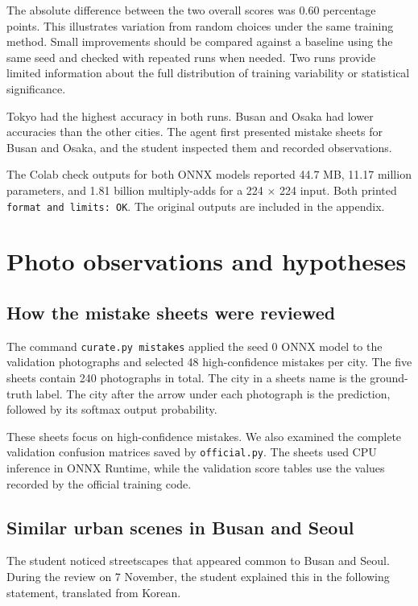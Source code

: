 \documentclass[11pt]{article}
\begin{document}
The absolute difference between the two overall scores was 0.60 percentage
points. This illustrates variation from random choices under the same training
method. Small improvements should be compared against a baseline using the
same seed and checked with repeated runs when needed. Two runs provide
limited information about the full distribution of training variability or
statistical significance.

Tokyo had the highest accuracy in both runs. Busan and Osaka had lower
accuracies than the other cities. The agent first presented mistake sheets
for Busan and Osaka, and the student inspected them and recorded observations.

The Colab check outputs for both ONNX models reported 44.7 MB, 11.17 million
parameters, and 1.81 billion multiply-adds for a 224 $\times$ 224 input.
Both printed \texttt{format and limits: OK}. The original outputs are included
in the appendix.

\section{Photo observations and hypotheses}

\subsection{How the mistake sheets were reviewed}

The command \texttt{curate.py mistakes} applied the seed 0 ONNX model to the
validation photographs and selected 48 high-confidence mistakes per city.
The five sheets contain 240 photographs in total. The city in a sheet\textquotesingle{}s name
is the ground-truth label. The city after the arrow under each photograph is
the prediction, followed by its softmax output probability.

These sheets focus on high-confidence mistakes. We also examined the complete
validation confusion matrices saved by \texttt{official.py}. The sheets used
CPU inference in ONNX Runtime, while the validation score tables use the
values recorded by the official training code.

\subsection{Similar urban scenes in Busan and Seoul}

The student noticed streetscapes that appeared common to Busan and Seoul.
During the review on 7 November, the student explained this in the following
statement, translated from Korean.
\end{document}
